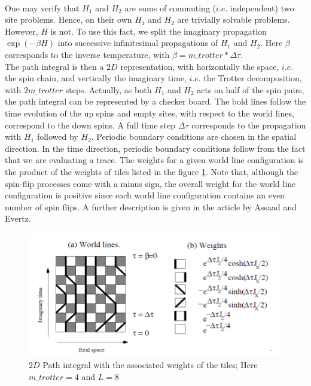 \documentclass[a4paper,12pt,twoside]{article}
\begin{document}
	\paragraph{} One may verify that $H_1$ and $H_2$ are sums of commuting ($i.e.$ independent) two site problems. Hence, on their own $H_1$ and $H_2$ are trivially solvable problems. However, $H$ is not. To use this fact, we split the imaginary propagation $\exp(-\beta H)$ into successive infinitesimal propagations of $H_1$ and $H_2$. Here $\beta$ corresponds
	to the inverse temperature, with $\beta = m\_trotter * \Delta \tau$.\\
	The path integral is then a $2D$ representation, with horizontally the space, $i.e.$ the spin chain, and vertically the imaginary time, $i.e.$ the Trotter decomposition, with $2 m\_trotter$ steps. Actually, as both $H_1$ and $H_2$ acts on half of the spin pairs, the path integral can be represented by a checker board. The bold lines follow the time evolution of the up	spins and empty sites, with respect to the world lines, correspond to the down spins. A full time step $\Delta \tau$ corresponds to the propagation with $H_1$ followed by	$H_2$. Periodic boundary conditions are chosen in the spatial direction. In the time direction, periodic boundary conditions follow from the fact that we are evaluating
	a trace. The weights for a given world line configuration is the product of the
	weights of tiles listed in the figure \ref{pathintegral}. Note that, although the spin-flip processes come with a minus sign, the overall weight for the world line configuration is positive since each world line configuration contains an even number of spin flips. A further description is given in the article by Assaad and Evertz. 
	
	\begin{figure}[!h]
		\centering
		\includegraphics[width=12cm]{pathintegral.png}
		\caption{$2D$ Path integral with the associated weights of the tiles; Here $m\_trotter = 4$ and $L=8$}
		\label{pathintegral}
	\end{figure}
\end{document}
